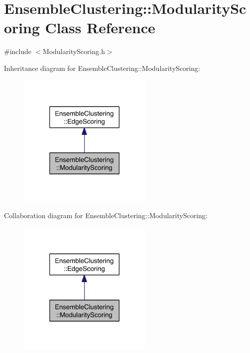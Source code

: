 \hypertarget{class_ensemble_clustering_1_1_modularity_scoring}{\section{Ensemble\-Clustering\-:\-:Modularity\-Scoring Class Reference}
\label{class_ensemble_clustering_1_1_modularity_scoring}
}


{\ttfamily \#include $<$Modularity\-Scoring.\-h$>$}



Inheritance diagram for Ensemble\-Clustering\-:\-:Modularity\-Scoring\-:\nopagebreak
\begin{figure}[H]
\begin{center}
\leavevmode
\includegraphics[width=184pt]{class_ensemble_clustering_1_1_modularity_scoring__inherit__graph}
\end{center}
\end{figure}


Collaboration diagram for Ensemble\-Clustering\-:\-:Modularity\-Scoring\-:\nopagebreak
\begin{figure}[H]
\begin{center}
\leavevmode
\includegraphics[width=184pt]{class_ensemble_clustering_1_1_modularity_scoring__coll__graph}
\end{center}
\end{figure}
